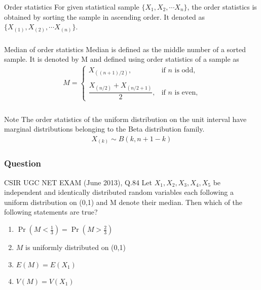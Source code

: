 \documentclass{beamer}
\providecommand{\pr}[1]{\ensuremath{\Pr\left(#1\right)}}
\begin{document}
\begin{frame}
\frametitle{}
\begin{block}{Order statistics}
For given statistical sample $\{X_1, X_2,\cdots X_n\}$, the order statistics is obtained by sorting the sample in ascending order. It denoted as $\{X_{(1)}, X_{(2)},\cdots X_{(n)}\}$.
\end{block}

\frametitle{}
\begin{block}{Median of order statistics}
Median is defined as the middle number of a sorted sample. It is denoted by M and defined using order statistics of a sample as
\begin{align}
  M =
  \begin{cases}
   X_{((n+1)/2)},                                           &\text{if $n$ is odd,} \\ \\
  \dfrac{ X_{(n/2)} + X_{(n/2+1)}}{2} ,                     &\text{if $n$ is even,} 
  \end{cases}
\end{align}
\label{median}\label{def2}
\end{block}
\end{frame}

\begin{frame}
\frametitle{}
\begin{block}{Note}
The order statistics of the uniform distribution on the unit interval have marginal distributions belonging to the Beta distribution family.
\begin{align}
X_{(k)} \sim B(k,n+1-k)
\end{align}\label{rem}
\end{block}
\end{frame}



\begin{frame}
\frametitle{Question}
\begin{block}{CSIR UGC NET EXAM (June 2013), Q.84}
Let $X_1,X_2,X_3,X_4,X_5$ be independent and identically distributed random variables each following a uniform distribution on (0,1) and M denote their median. Then which of the following statements are true?
\begin{enumerate}
    \item $\pr{M<\frac{1}{3}}=\pr{M>\frac{2}{3}}$\\
    \item $M$ is uniformly distributed on (0,1)\\
    \item $E(M)=E(X_1)$\\
    \item $V(M)=V(X_1)$
\end{enumerate}
\end{block}
\end{frame}
\end{document}

